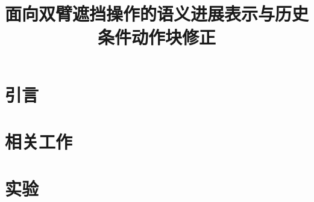 \documentclass[journal,10pt]{IEEEtran}
\title{面向双臂遮挡操作的语义进展表示与历史条件动作块修正}
\author{}
\begin{document}
\maketitle
\section{引言}
\label{sec:intro}
\section{相关工作}
\label{sec:related}


\section{实验}
\label{sec:experiments}


\end{document}
